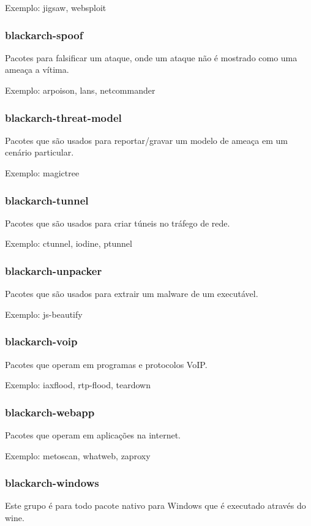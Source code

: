 \documentclass[a4paper, oneside, 11pt]{book}
\begin{document}
Exemplo: jigsaw, websploit

\subsubsection{blackarch-spoof}
Pacotes para falsificar um ataque, onde um ataque não é mostrado como uma ameaça a vítima.

Exemplo: arpoison, lans, netcommander

\subsubsection{blackarch-threat-model}
Pacotes que são usados para reportar/gravar um modelo de ameaça em um cenário particular.

Exemplo: magictree

\subsubsection{blackarch-tunnel}
Pacotes que são usados para criar túneis no tráfego de rede.

Exemplo: ctunnel, iodine, ptunnel

\subsubsection{blackarch-unpacker}
Pacotes que são usados para extrair um malware de um executável.

Exemplo: js-beautify

\subsubsection{blackarch-voip}
Pacotes que operam em programas e protocolos VoIP.

Exemplo: iaxflood, rtp-flood, teardown

\subsubsection{blackarch-webapp}
Pacotes que operam em aplicações na internet.

Exemplo: metoscan, whatweb, zaproxy

\subsubsection{blackarch-windows}
Este grupo é para todo pacote nativo para Windows que é executado através do wine.
\end{document}
